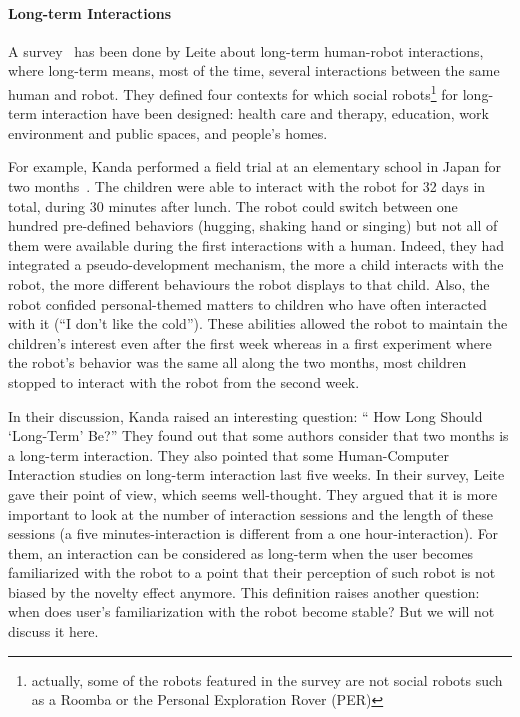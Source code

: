 \documentclass[a4paper,11pt,twoside]{StyleThese}
\begin{document}
\paragraph{Long-term Interactions}
A survey~\cite{leite_2013_social} has been done by Leite \etal{} about long-term human-robot interactions, where long-term means, most of the time, several interactions between the same human and robot. They defined four contexts for which social robots\footnote{actually, some of the robots featured in the survey are not social robots such as a Roomba or the Personal Exploration Rover (PER)} for long-term interaction have been designed: health care and therapy, education, work environment and public spaces, and people's homes. 

For example, Kanda \etal{} performed a field trial at an elementary school in Japan for two months~\cite{kanda_2007_two}. The children were able to interact with the robot for 32 days in total, during 30 minutes after lunch. The robot could switch between one hundred pre-defined behaviors (\eg hugging, shaking hand or singing) but not all of them were available during the first interactions with a human. Indeed, they had integrated a pseudo-development mechanism, \ie the more a child interacts with the robot, the more different behaviours the robot displays to that child. Also, the robot confided personal-themed matters to children who have often interacted with it (\eg ``I don't like the cold''). These abilities allowed the robot to maintain the children's interest even after the first week whereas in a first experiment where the robot's behavior was the same all along the two months, most children stopped to interact with the robot from the second week. 

In their discussion, Kanda \etal{} raised an interesting question: `` How Long Should \textquoteleft Long-Term\textquoteright{} Be?'' They found out that some authors consider that two months is a long-term interaction. They also pointed that some Human-Computer Interaction studies on long-term interaction last five weeks. In their survey, Leite \etal{} gave their point of view, which seems well-thought. They argued that it is more important to look at the number of interaction sessions and the length of these sessions (a five minutes-interaction is different from a one hour-interaction). For them, an interaction can be considered as long-term when the user becomes familiarized with the robot to a point that their perception of such robot is not biased by the novelty effect anymore. This definition raises another question: when does user’s familiarization with the robot become stable? But we will not discuss it here.
\end{document}
